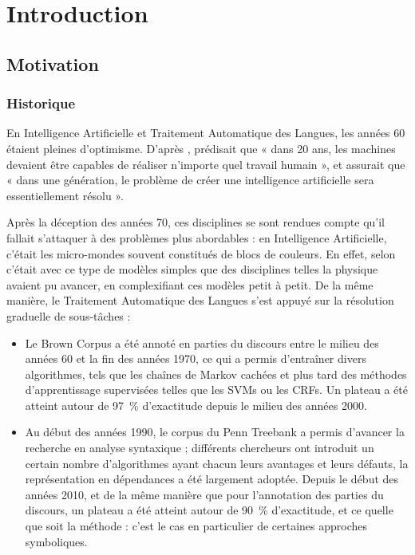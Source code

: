 \chapter{Introduction}
\label{ch:intro}

\section{Motivation}

\subsection{Historique}

En Intelligence Artificielle et Traitement Automatique des Langues, les années
60 étaient pleines d'optimisme. D'après \citep{crevier1993},
\cite{simon1965shape} prédisait que « dans 20 ans, les machines devaient être
capables de réaliser n'importe quel travail humain », et \cite{minsky1967}
assurait que « dans une génération, le problème de créer une intelligence
artificielle sera essentiellement résolu ».

Après la déception des années 70, ces disciplines se sont rendues compte qu'il
fallait s'attaquer à des problèmes plus abordables : en Intelligence
Artificielle, c'était les micro-mondes souvent constitués de blocs de couleurs.
En effet, selon \citep{} c'était avec ce type de modèles simples que des
disciplines telles la physique avaient pu avancer, en complexifiant ces modèles
petit à petit. De la même manière, le Traitement Automatique des Langues s'est
appuyé sur la résolution graduelle de sous-tâches :

\begin{itemize}
    \item Le Brown Corpus a été annoté en parties du discours entre le milieu
        des années 60 et la fin des années 1970, ce qui a permis d'entraîner
        divers algorithmes, tels que les chaînes de Markov cachées et plus
        tard des méthodes d'apprentissage supervisées telles que les SVMs ou les
        CRFs. Un plateau a été atteint autour de 97~\% d'exactitude depuis le
        milieu des années 2000.
    \item Au début des années 1990, le corpus du Penn Treebank a permis
        d'avancer la recherche en analyse syntaxique ; différents chercheurs
        ont introduit un certain nombre d'algorithmes ayant chacun leurs
        avantages et leurs défauts, la représentation en dépendances a été
        largement adoptée. Depuis le début des années 2010, et de la même
        manière que pour l'annotation des parties du discours, un plateau a été
        atteint autour de 90~\% d'exactitude, et ce quelle que soit la méthode
        : c'est le cas en particulier de certaines approches symboliques.
\end{itemize}


